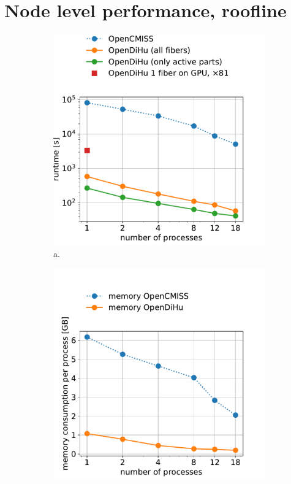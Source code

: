 \section{Node level performance, roofline}

\begin{figure}[H]
  \centering%
  \begin{subfigure}[t]{0.48\textwidth}%
    \centering%
    \includegraphics[width=\textwidth]{images/results/studies/0_weak_scaling_runtime.pdf}%
    \caption{a.}%
    \label{fig:16_hodgkin_huxley_cpu}%
  \end{subfigure}
  \quad
  \begin{subfigure}[t]{0.48\textwidth}%
    \centering%
    \includegraphics[width=\textwidth]{images/results/studies/0_weak_scaling_memory.pdf}%

\end{subfigure}
\end{figure}
